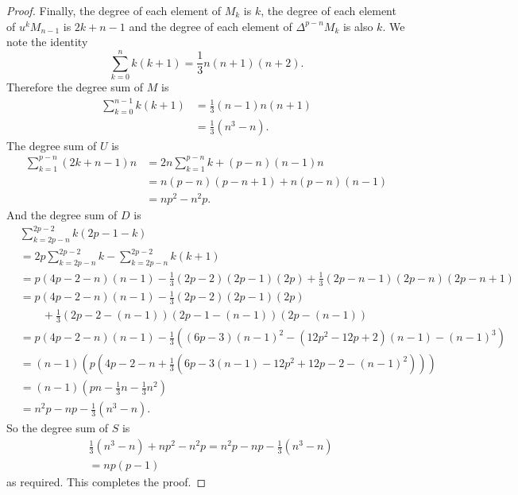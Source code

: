 \documentclass[a4paper]{amsart}
\newtheorem*{Corollary of Conjecture}{Corollary of Conjecture}
\theoremstyle{definition}
\theoremstyle{remark}
\theoremstyle{Acknowledgments}
\begin{document}
\begin{proof}
Finally, the degree of each element of $M_k$ is $k$, the degree of each element of $u^kM_{n-1}$ is $2k+n-1$ and the degree of each element of $\Delta^{p-n}M_k$ is also $k$. We note the identity
\[\sum_{k=0}^n k(k+1) = \frac13 n(n+1)(n+2).\]
Therefore the degree sum of $M$ is
\begin{align*}
\sum_{k=0}^{n-1} k(k+1) &= \frac13(n-1)n(n+1)\\
&= \frac13 (n^3-n).
\end{align*}
The degree sum of $U$ is
\begin{align*}
\sum_{k=1}^{p-n} (2k+n-1)n &= 2n \sum_{k=1}^{p-n}k + (p-n)(n-1)n\\
&= n(p-n)(p-n+1)+n(p-n)(n-1)\\
&=np^2-n^2p.
\end{align*}
And the degree sum of $D$ is
\begin{align*}
&\sum_{k=2p-n}^{2p-2} k(2p-1-k)\\
&= 2p \sum_{k=2p-n}^{2p-2}k - \sum_{k=2p-n}^{2p-2}k(k+1)\\
&= p(4p-2-n)(n-1) - \frac13(2p-2)(2p-1)(2p) + \frac13 (2p-n-1)(2p-n)(2p-n+1)\\
&= p(4p-2-n)(n-1) - \frac13(2p-2)(2p-1)(2p)\\
& \qquad + \frac13 (2p-2-(n-1))(2p-1-(n-1))(2p-(n-1))\\
&= p(4p-2-n)(n-1) - \frac13\left((6p-3)(n-1)^2 - (12p^2-12p+2)(n-1)-(n-1)^3 \right)\\
&= (n-1)\left(p(4p-2-n+\frac13(6p-3(n-1)-12p^2+12p-2-(n-1)^2)) \right)\\
&= (n-1)(pn-\frac13n - \frac13n^2 )\\
&= n^2p-np-\frac13(n^3-n).
\end{align*}
So the degree sum of $S$ is
\begin{align*}
&\frac13 (n^3-n)+np^2-n^2p=n^2p-np-\frac13(n^3-n)\\
& = np(p-1)
\end{align*}
as required. This completes the proof.
\end{proof}


\end{document}
